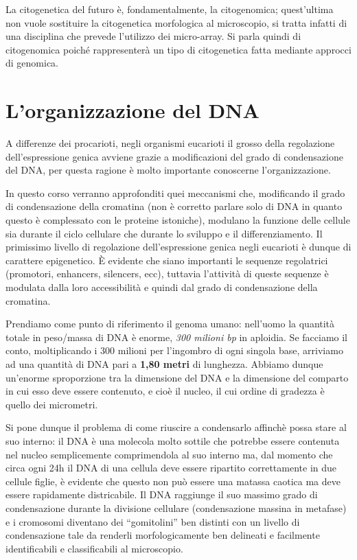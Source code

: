 \documentclass[11pt]{book}
\begin{document}
\clearpage
La citogenetica del futuro è, fondamentalmente, la citogenomica; quest’ultima non vuole sostituire la citogenetica morfologica al microscopio, si tratta infatti di una disciplina che prevede l’utilizzo dei micro-array. Si parla quindi di citogenomica poiché rappresenterà un tipo di citogenetica fatta mediante approcci di genomica. 

\chapter{L'organizzazione del DNA}

A differenze dei procarioti, negli organismi eucarioti il grosso della regolazione dell'espressione genica avviene grazie a modificazioni del grado di condensazione del DNA, per questa ragione è molto importante conoscerne l'organizzazione.

In questo corso verranno approfonditi quei meccanismi che, modificando il grado di condensazione della cromatina (non è corretto parlare solo di DNA in quanto questo è complessato con le proteine istoniche), modulano la funzione delle cellule sia durante il ciclo cellulare che durante lo sviluppo e il differenziamento.
Il primissimo livello di regolazione dell’espressione genica negli eucarioti è dunque di carattere epigenetico. È evidente che siano importanti le sequenze regolatrici (promotori, enhancers, silencers, ecc), tuttavia l’attività di queste sequenze è modulata dalla loro accessibilità e quindi dal grado di condensazione della cromatina.

Prendiamo come punto di riferimento il genoma umano: nell’uomo la quantità totale in peso/massa di DNA è enorme, \emph{300 milioni bp} in aploidia. Se facciamo il conto, moltiplicando i 300 milioni per l’ingombro di ogni singola base, arriviamo ad una quantità di DNA pari a \textbf{1,80 metri} di lunghezza. Abbiamo dunque un'enorme sproporzione tra la dimensione del DNA e la dimensione del comparto in cui esso deve essere contenuto, e cioè il nucleo, il cui ordine di gradezza è quello dei micrometri. 

Si pone dunque il problema di come riuscire a condensarlo affinchè possa stare al suo interno: il DNA è una molecola molto sottile che potrebbe essere contenuta nel nucleo semplicemente comprimendola al suo interno ma, dal momento che circa ogni 24h il DNA di una cellula deve essere ripartito correttamente in due cellule figlie, è evidente che questo non può essere una matassa caotica ma deve essere rapidamente districabile. 
Il DNA raggiunge il suo massimo grado di condensazione durante la divisione cellulare (condensazione massina in metafase) e i cromosomi diventano dei ``gomitolini'' ben distinti con un livello di condensazione tale da renderli morfologicamente ben delineati e facilmente identificabili e classificabili al microscopio.
\end{document}
